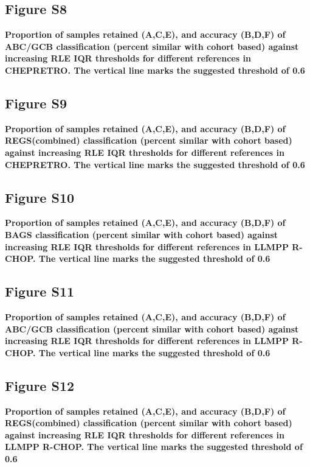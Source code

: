 \documentclass[10pt,letterpaper]{article}
\begin{document}
\subsection*{Figure S8} \label{fig:chep_rle_clas_abcgcb}
{\bf Proportion of samples retained (A,C,E), and accuracy (B,D,F) of ABC/GCB classification (percent similar with cohort based) against increasing RLE IQR thresholds for different references in CHEPRETRO. The vertical line marks the suggested threshold of 0.6}

\subsection*{Figure S9} \label{fig:chep_rle_clas_regs}
{\bf Proportion of samples retained (A,C,E), and accuracy (B,D,F) of REGS(combined) classification (percent similar with cohort based) against increasing RLE IQR thresholds for different references in CHEPRETRO. The vertical line marks the suggested threshold of 0.6}

\subsection*{Figure S10} \label{fig:RCHOP_rle_clas_bags}
{\bf Proportion of samples retained (A,C,E), and accuracy (B,D,F) of BAGS classification (percent similar with cohort based) against increasing RLE IQR thresholds for different references in LLMPP R-CHOP. The vertical line marks the suggested threshold of 0.6}

\subsection*{Figure S11} \label{fig:RCHOP_rle_clas_abcgcb}
{\bf Proportion of samples retained (A,C,E), and accuracy (B,D,F) of ABC/GCB classification (percent similar with cohort based) against increasing RLE IQR thresholds for different references in LLMPP R-CHOP. The vertical line marks the suggested threshold of 0.6}

\subsection*{Figure S12} \label{fig:RCHOP_rle_clas_regs}
{\bf Proportion of samples retained (A,C,E), and accuracy (B,D,F) of REGS(combined) classification (percent similar with cohort based) against increasing RLE IQR thresholds for different references in LLMPP R-CHOP. The vertical line marks the suggested threshold of 0.6}
\end{document}

